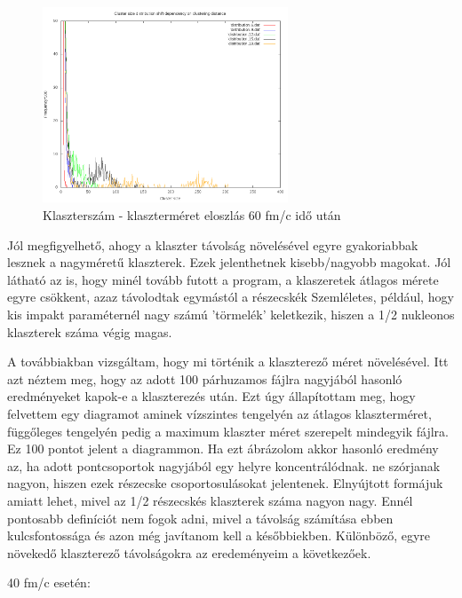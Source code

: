 \documentclass[a4paper,12pt]{article}
\begin{document}
	\begin{figure}[H]
		\centering
		\includegraphics[width=0.65\textwidth]{ShiftInDistro120.png}
		\caption{ Klaszterszám - klaszterméret eloszlás 60 fm/c idő után} 
\end{figure}
\par Jól megfigyelhető, ahogy a klaszter távolság növelésével egyre gyakoriabbak lesznek a nagyméretű klaszterek. Ezek jelenthetnek kisebb/nagyobb
magokat. Jól látható az is, hogy minél tovább futott a program, a klaszeretek átlagos mérete egyre csökkent, azaz távolodtak egymástól a részecskék
Szemléletes, például, hogy kis impakt paraméternél nagy számú 'törmelék' keletkezik, hiszen a 1/2 nukleonos klaszterek száma végig magas.
\par A továbbiakban vizsgáltam, hogy mi történik a klaszterező méret növelésével. Itt azt néztem meg, hogy az adott 100 párhuzamos fájlra nagyjából 
hasonló eredményeket kapok-e a klaszterezés után. Ezt úgy állapítottam meg, hogy felvettem egy diagramot aminek vízszintes tengelyén az átlagos 
klaszterméret, függőleges tengelyén pedig a maximum klaszter méret szerepelt mindegyik fájlra. Ez 100 pontot jelent a diagrammon. Ha ezt ábrázolom
akkor hasonló eredmény az, ha adott pontcsoportok nagyjából egy helyre koncentrálódnak. ne szórjanak nagyon, hiszen ezek részecske csoportosulásokat jelentenek. Elnyújtott formájuk amiatt lehet, mivel az 1/2 részecskés klaszterek száma nagyon nagy. Ennél pontosabb definíciót nem fogok adni, mivel a távolság számítása
ebben kulcsfontossága és azon még javítanom kell a későbbiekben. Különböző, egyre növekedő klaszterező távolságokra az eredeményeim a következőek.
\par 40 fm/c esetén:
\end{document}
